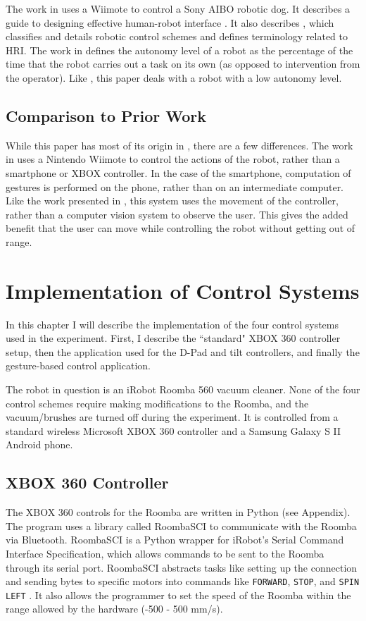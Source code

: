 \documentclass[12pt,a4paper]{report}
\begin{document}
The work in \cite{Guo} uses a Wiimote to control a Sony AIBO robotic dog. It describes a guide to designing effective human-robot interface \cite{GoodrichOlsen}. It also describes \cite{YancoDrury}, which classifies and details robotic control schemes and defines terminology related to HRI. The work in \cite{YancoDrury} defines the autonomy level of a robot as the percentage of the time that the robot carries out a task on its own (as opposed to intervention from the operator). Like \cite{Guo}, this paper deals with a robot with a low autonomy level.

\section*{Comparison to Prior Work}
While this paper has most of its origin in \cite{Varcholik_Barber_Nicholson_2008}, there are a few differences. The work in \cite{Varcholik_Barber_Nicholson_2008} uses a Nintendo Wiimote to control the actions of the robot, rather than a smartphone or XBOX controller. In the case of the smartphone, computation of gestures is performed on the phone, rather than on an intermediate computer. Like the work presented in \cite{Varcholik_Barber_Nicholson_2008}, this system uses the movement of the controller, rather than a computer vision system to observe the user. This gives the added benefit that the user can move while controlling the robot without getting out of range.

\chapter{Implementation of Control Systems}
In this chapter I will describe the implementation of the four control systems used in the experiment. First, I describe the ``standard" XBOX 360 controller setup, then the application used for the D-Pad and tilt controllers, and finally the gesture-based control application.

The robot in question is an iRobot Roomba 560 vacuum  cleaner. None of the four control schemes require making modifications to the Roomba, and the vacuum/brushes are turned off during the experiment. It is controlled from a standard wireless Microsoft XBOX 360 controller and a Samsung Galaxy S II Android phone.
\section{XBOX 360 Controller}
The XBOX 360 controls for the Roomba are written in Python (see Appendix). The program uses a library called RoombaSCI to communicate with the Roomba via Bluetooth. RoombaSCI is a Python wrapper for iRobot's Serial Command Interface Specification, which allows commands to be sent to the Roomba through its serial port. RoombaSCI abstracts tasks like setting up the connection and sending bytes to specific motors into commands like \texttt{FORWARD}, \texttt{STOP}, and \texttt{SPIN LEFT} \cite{RoombaSCI}. It also allows the programmer to set the speed of the Roomba within the range allowed by the hardware (-500 - 500 mm/s). \cite{iRobot}
\end{document}
